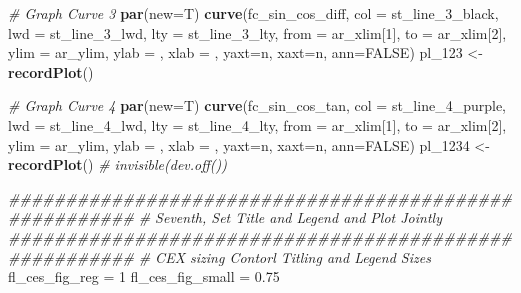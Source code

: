 \documentclass[
]{book}
\newenvironment{Shaded}{\begin{snugshade}}{\end{snugshade}}
\newcommand{\CommentTok}[1]{\textcolor[rgb]{0.56,0.35,0.01}{\textit{#1}}}
\newcommand{\DataTypeTok}[1]{\textcolor[rgb]{0.13,0.29,0.53}{#1}}
\newcommand{\DecValTok}[1]{\textcolor[rgb]{0.00,0.00,0.81}{#1}}
\newcommand{\FloatTok}[1]{\textcolor[rgb]{0.00,0.00,0.81}{#1}}
\newcommand{\KeywordTok}[1]{\textcolor[rgb]{0.13,0.29,0.53}{\textbf{#1}}}
\newcommand{\NormalTok}[1]{#1}
\newcommand{\OtherTok}[1]{\textcolor[rgb]{0.56,0.35,0.01}{#1}}
\newcommand{\StringTok}[1]{\textcolor[rgb]{0.31,0.60,0.02}{#1}}
\begin{document}
\begin{Shaded}
\begin{Highlighting}[]
\CommentTok{\# Graph Curve 3}
\KeywordTok{par}\NormalTok{(}\DataTypeTok{new=}\NormalTok{T)}
\KeywordTok{curve}\NormalTok{(fc\_sin\_cos\_diff,}
      \DataTypeTok{col =}\NormalTok{ st\_line\_}\DecValTok{3}\NormalTok{\_black,}
      \DataTypeTok{lwd =}\NormalTok{ st\_line\_}\DecValTok{3}\NormalTok{\_lwd, }\DataTypeTok{lty =}\NormalTok{ st\_line\_}\DecValTok{3}\NormalTok{\_lty,}
      \DataTypeTok{from =}\NormalTok{ ar\_xlim[}\DecValTok{1}\NormalTok{], }\DataTypeTok{to =}\NormalTok{ ar\_xlim[}\DecValTok{2}\NormalTok{], }\DataTypeTok{ylim =}\NormalTok{ ar\_ylim,}
      \DataTypeTok{ylab =} \StringTok{\textquotesingle{}\textquotesingle{}}\NormalTok{, }\DataTypeTok{xlab =} \StringTok{\textquotesingle{}\textquotesingle{}}\NormalTok{, }\DataTypeTok{yaxt=}\StringTok{\textquotesingle{}n\textquotesingle{}}\NormalTok{, }\DataTypeTok{xaxt=}\StringTok{\textquotesingle{}n\textquotesingle{}}\NormalTok{, }\DataTypeTok{ann=}\OtherTok{FALSE}\NormalTok{)}
\NormalTok{pl\_}\DecValTok{123}\NormalTok{ \textless{}{-}}\StringTok{ }\KeywordTok{recordPlot}\NormalTok{()}

\CommentTok{\# Graph Curve 4}
\KeywordTok{par}\NormalTok{(}\DataTypeTok{new=}\NormalTok{T)}
\KeywordTok{curve}\NormalTok{(fc\_sin\_cos\_tan,}
      \DataTypeTok{col =}\NormalTok{ st\_line\_}\DecValTok{4}\NormalTok{\_purple,}
      \DataTypeTok{lwd =}\NormalTok{ st\_line\_}\DecValTok{4}\NormalTok{\_lwd, }\DataTypeTok{lty =}\NormalTok{ st\_line\_}\DecValTok{4}\NormalTok{\_lty,}
      \DataTypeTok{from =}\NormalTok{ ar\_xlim[}\DecValTok{1}\NormalTok{], }\DataTypeTok{to =}\NormalTok{ ar\_xlim[}\DecValTok{2}\NormalTok{], }\DataTypeTok{ylim =}\NormalTok{ ar\_ylim,}
      \DataTypeTok{ylab =} \StringTok{\textquotesingle{}\textquotesingle{}}\NormalTok{, }\DataTypeTok{xlab =} \StringTok{\textquotesingle{}\textquotesingle{}}\NormalTok{, }\DataTypeTok{yaxt=}\StringTok{\textquotesingle{}n\textquotesingle{}}\NormalTok{, }\DataTypeTok{xaxt=}\StringTok{\textquotesingle{}n\textquotesingle{}}\NormalTok{, }\DataTypeTok{ann=}\OtherTok{FALSE}\NormalTok{)}
\NormalTok{pl\_}\DecValTok{1234}\NormalTok{ \textless{}{-}}\StringTok{ }\KeywordTok{recordPlot}\NormalTok{()}
\CommentTok{\# invisible(dev.off())}

\CommentTok{\#\#\#\#\#\#\#\#\#\#\#\#\#\#\#\#\#\#\#\#\#\#\#\#\#\#\#\#\#\#\#\#\#\#\#\#\#\#\#\#\#\#\#\#\#\#\#\#\#\#\#\#\#\#\#}
\CommentTok{\# Seventh, Set Title and Legend and Plot Jointly}
\CommentTok{\#\#\#\#\#\#\#\#\#\#\#\#\#\#\#\#\#\#\#\#\#\#\#\#\#\#\#\#\#\#\#\#\#\#\#\#\#\#\#\#\#\#\#\#\#\#\#\#\#\#\#\#\#\#\#}
\CommentTok{\# CEX sizing Contorl Titling and Legend Sizes}
\NormalTok{fl\_ces\_fig\_reg =}\StringTok{ }\DecValTok{1}
\NormalTok{fl\_ces\_fig\_small =}\StringTok{ }\FloatTok{0.75}


\end{Highlighting}
\end{Shaded}
\end{document}
